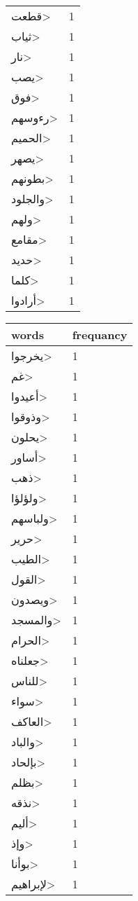 \documentclass{article}
\begin{document}
\begin{multicols}{3}
\begin{center}
\begin{tabular}{ P{2cm}  P{1cm}}
\<قطعت> & 1 \\ 
\<ثياب> & 1 \\ 
\<نار> & 1 \\ 
\<يصب> & 1 \\ 
\<فوق> & 1 \\ 
\<رءوسهم> & 1 \\ 
\<الحميم> & 1 \\ 
\<يصهر> & 1 \\ 
\<بطونهم> & 1 \\ 
\<والجلود> & 1 \\ 
\<ولهم> & 1 \\ 
\<مقامع> & 1 \\ 
\<حديد> & 1 \\ 
\<كلما> & 1 \\ 
\<أرادوا> & 1 \\ 
\end{tabular} 
\begin{tabular}{ P{2cm}  P{1cm}} 
\textbf{words}    & \textbf{frequancy}  \\
\hline
\<يخرجوا> & 1 \\ 
\<غم> & 1 \\ 
\<أعيدوا> & 1 \\ 
\<وذوقوا> & 1 \\ 
\<يحلون> & 1 \\ 
\<أساور> & 1 \\ 
\<ذهب> & 1 \\ 
\<ولؤلؤا> & 1 \\ 
\<ولباسهم> & 1 \\ 
\<حرير> & 1 \\ 
\<الطيب> & 1 \\ 
\<القول> & 1 \\ 
\<ويصدون> & 1 \\ 
\<والمسجد> & 1 \\ 
\<الحرام> & 1 \\ 
\<جعلناه> & 1 \\ 
\<للناس> & 1 \\ 
\<سواء> & 1 \\ 
\<العاكف> & 1 \\ 
\<والباد> & 1 \\ 
\<بإلحاد> & 1 \\ 
\<بظلم> & 1 \\ 
\<نذقه> & 1 \\ 
\<أليم> & 1 \\ 
\<وإذ> & 1 \\ 
\<بوأنا> & 1 \\ 
\<لإبراهيم> & 1 \\ 

\end{tabular}
\end{center}
\end{multicols}
\end{document}
